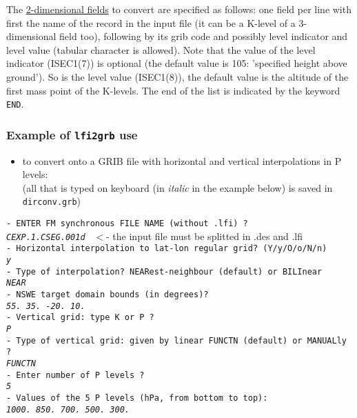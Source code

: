 The \underline{2-dimensional fields} to convert are specified as follows:
one field per line with first the name of the record in the input file
(it can be a K-level of a 3-dimensional field too),
following by its grib code and possibly level indicator and level value
(tabular character is allowed).
Note that the value of the level indicator ({\sf ISEC1(7)}) is optional 
(the default value is 105: {\sf 'specified height above ground'}).
So is the level value ({\sf ISEC1(8)}), the default value is the altitude of 
the first mass point of the K-levels.
The end of the list is indicated by the keyword {\tt END}.

\subsubsection{Example of {\tt lfi2grb} use}
\begin{itemize}
\item to convert onto a GRIB file with horizontal and vertical interpolations in P levels:\\
(all that is typed on keyboard (in {\it italic} in the example below)
is saved in {\tt dirconv.grb})
\end{itemize}
\small
{\tt - ENTER FM synchronous FILE NAME (without .lfi) ?}  \\
{\tt\it CEXP.1.CSEG.001d } \hspace{3.5cm} $<$- the input file must be splitted in .des and .lfi \\
{\tt - Horizontal interpolation to lat-lon regular grid? (Y/y/O/o/N/n)}\\
{\tt\it y }  \\
{\tt - Type of interpolation? NEARest-neighbour (default) or BILInear }\\
{\tt\it NEAR }  \\
{\tt  - NSWE target domain bounds (in degrees)? }\\
{\tt\it 55. 35. -20. 10. }  \\
{\tt - Vertical grid: type K or P ? }\\
{\tt\it P }  \\
{\tt - Type of vertical grid: given by linear FUNCTN (default) or MANUALly ?}\\
{\tt\it FUNCTN }  \\
{\tt - Enter number of P levels ?} \\
{\tt\it 5 }  \\
{\tt - Values of the  5  P levels (hPa, from bottom to top):} \\
{\tt\it 1000. 850. 700. 500. 300. }  \\
